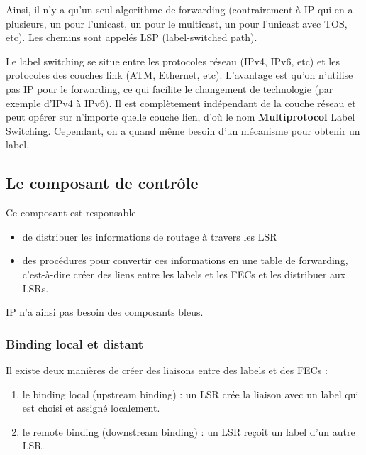 		Ainsi, il n'y a qu'un seul algorithme de forwarding (contrairement à IP qui en a plusieurs, un pour l'unicast, un pour le multicast, un pour l'unicast avec TOS, etc). Les chemins sont appelés LSP (label-switched path).
		
		
		Le label switching se situe entre les protocoles réseau (IPv4, IPv6, etc) et les protocoles des couches link (ATM, Ethernet, etc). L'avantage est qu'on n'utilise pas IP pour le forwarding, ce qui facilite le changement de technologie (par exemple d'IPv4 à IPv6). Il est complètement indépendant de la couche réseau et peut opérer sur n'importe quelle couche lien, d'où le nom \textbf{Multiprotocol} Label Switching. Cependant, on a quand même besoin d'un mécanisme pour obtenir un label.
		
		
		\subsection{Le composant de contrôle}
		
		
		Ce composant est responsable
		
		\begin{itemize}
			\item de distribuer les informations de routage à travers les LSR
			\item des procédures pour convertir ces informations en une table de forwarding, c'est-à-dire créer des liens entre les labels et les FECs et les distribuer aux LSRs.
		\end{itemize}
		
		IP n'a ainsi pas besoin des composants bleus.
		
		
		\subsubsection{Binding local et distant}
		Il existe deux manières de créer des liaisons entre des labels et des FECs :
		
		\begin{enumerate}
			\item le binding local (upstream binding) : un LSR crée la liaison avec un label qui est choisi et assigné localement.
			
			\item le remote binding (downstream binding) : un LSR reçoit un label d'un autre LSR.
		\end{enumerate}
		
